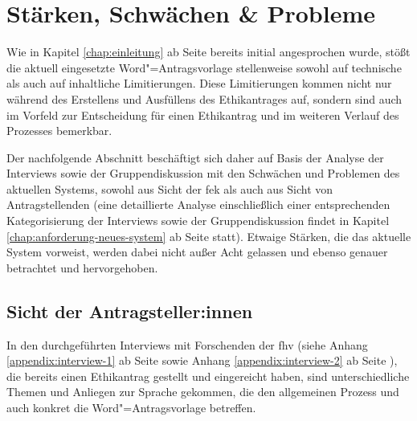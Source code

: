 \documentclass[a4paper,12pt,twoside]{scrreprt}
\begin{document}
\section{Stärken, Schwächen \& Probleme}
\label{sec:stärken-schwächen-probleme}

Wie in Kapitel \ref{chap:einleitung} ab Seite \pageref{chap:einleitung} bereits initial angesprochen wurde, stößt die aktuell eingesetzte Word"=Antragsvorlage stellenweise sowohl auf technische als auch auf inhaltliche Limitierungen. Diese Limitierungen kommen nicht nur während des Erstellens und Ausfüllens des Ethikantrages auf, sondern sind auch im Vorfeld zur Entscheidung für einen Ethikantrag und im weiteren Verlauf des Prozesses bemerkbar.

Der nachfolgende Abschnitt beschäftigt sich daher auf Basis der Analyse der Interviews sowie der Gruppendiskussion mit den Schwächen und Problemen des aktuellen Systems, sowohl aus Sicht der \ac{fek} als auch aus Sicht von Antragstellenden (eine detaillierte Analyse einschließlich einer entsprechenden Kategorisierung der Interviews sowie der Gruppendiskussion findet in Kapitel \ref{chap:anforderung-neues-system} ab Seite \pageref{chap:anforderung-neues-system} statt). Etwaige Stärken, die das aktuelle System vorweist, werden dabei nicht außer Acht gelassen und ebenso genauer betrachtet und hervorgehoben. 

\subsection{Sicht der Antragsteller:innen}
\label{sub-sec:probleme-sicht-Antragsteller}

In den durchgeführten Interviews mit Forschenden der \ac{fhv} (siehe Anhang \ref{appendix:interview-1} ab Seite \pageref{appendix:interview-1} sowie Anhang \ref{appendix:interview-2} ab Seite \pageref{appendix:interview-2}), die bereits einen Ethikantrag gestellt und eingereicht haben, sind unterschiedliche Themen und Anliegen zur Sprache gekommen, die den allgemeinen Prozess und auch konkret die Word"=Antragsvorlage betreffen.
\end{document}
